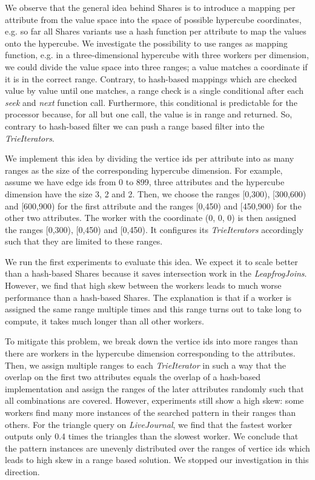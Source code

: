 We observe that the general idea behind Shares is to introduce a mapping per attribute from the value space into the space of possible
hypercube coordinates, e.g. so far all Shares variants use a hash function per attribute to map the values onto the hypercube.
We investigate the possibility to use ranges as mapping function, e.g. in a three-dimensional hypercube with three workers per dimension,
we could divide the value space into three ranges; a value matches a coordinate if it is in the correct range.
Contrary, to hash-based mappings which are checked value by value until one matches, a range check is a single conditional after each
\textit{seek} and \textit{next} function call.
Furthermore, this conditional is predictable for the processor because, for all but one call, the value is in range and returned.
So, contrary to hash-based filter we can push a range based filter into the \textit{TrieIterators}.

We implement this idea by dividing the vertice ids per attribute into as many ranges as the size of the corresponding hypercube dimension.
For example, assume we have edge ids from 0 to 899, three attributes and the hypercube dimension have the size 3, 2 and 2.
Then, we choose the ranges [0,300), [300,600) and [600,900) for the first attribute and the ranges [0,450) and [450,900) for the other
two attributes.
The worker with the coordinate (0, 0, 0) is then assigned the ranges [0,300), [0,450) and [0,450).
It configures its \textit{TrieIterators} accordingly such that they are limited to these ranges.

We run the first experiments to evaluate this idea.
We expect it to scale better than a hash-based Shares because it saves intersection work in the \textit{LeapfrogJoins}.
However, we find that high skew between the workers leads to much worse performance than a hash-based Shares.
The explanation is that if a worker is assigned the same range multiple times and this range turns out to take long to compute, it takes
much longer than all other workers.

To mitigate this problem, we break down the vertice ids into more ranges than there are workers in the hypercube dimension corresponding to
the attributes.
Then, we assign multiple ranges to each \textit{TrieIterator} in such a way that the overlap on the first two attributes equals the overlap
of a hash-based implementation and assign the ranges of the later attributes randomly such that all combinations are covered.
However, experiments still show a high skew: some workers find many more instances of the searched pattern in their ranges than others.
For the triangle query on \textit{LiveJournal}, we find that the fastest worker outputs only 0.4 times the triangles than the slowest worker.
We conclude that the pattern instances are unevenly distributed over the ranges of vertice ids which leads to high skew in
a range based solution.
We stopped our investigation in this direction.

